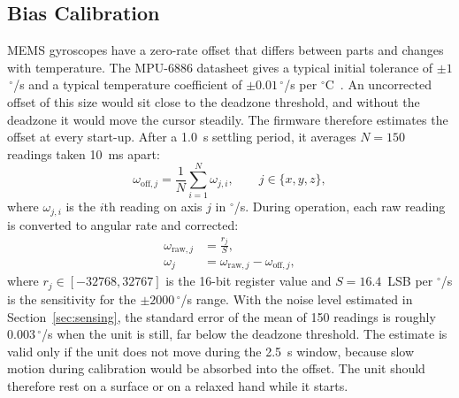 \documentclass[journal]{IEEEtran}
\newcommand{\dps}{\ensuremath{^{\circ}}/s}
\newcommand{\degC}{\ensuremath{^{\circ}}C}
\begin{document}
\subsection{Bias Calibration}
\label{sec:calibration}
MEMS gyroscopes have a zero-rate offset that differs between parts and changes with temperature. The MPU-6886 datasheet gives a typical initial tolerance of $\pm1$\,\dps{} and a typical temperature coefficient of $\pm0.01$\,\dps{} per \degC~\cite{mpu6886}. An uncorrected offset of this size would sit close to the deadzone threshold, and without the deadzone it would move the cursor steadily. The firmware therefore estimates the offset at every start-up. After a 1.0~s settling period, it averages $N=150$ readings taken 10~ms apart:
\begin{equation}
\omega_{\mathrm{off},j}=\frac{1}{N}\sum_{i=1}^{N}\omega_{j,i},\qquad j\in\{x,y,z\},
\label{eq:bias}
\end{equation}
where $\omega_{j,i}$ is the $i$th reading on axis $j$ in \dps. During operation, each raw reading is converted to angular rate and corrected:
\begin{align}
\omega_{\mathrm{raw},j}&=\frac{r_j}{S}, \label{eq:raw}\\
\omega_{j}&=\omega_{\mathrm{raw},j}-\omega_{\mathrm{off},j}, \label{eq:corr}
\end{align}
where $r_j\in[-32768,32767]$ is the 16-bit register value and $S=16.4$~LSB per \dps{} is the sensitivity for the $\pm2000$\,\dps{} range. With the noise level estimated in Section~\ref{sec:sensing}, the standard error of the mean of 150 readings is roughly 0.003\,\dps{} when the unit is still, far below the deadzone threshold. The estimate is valid only if the unit does not move during the 2.5~s window, because slow motion during calibration would be absorbed into the offset. The unit should therefore rest on a surface or on a relaxed hand while it starts.
\end{document}

